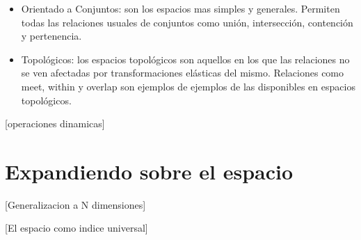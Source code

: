 \begin{itemize}
    \item Orientado a Conjuntos: son los espacios mas simples y generales. Permiten todas las relaciones usuales de conjuntos como unión, intersección, contención y pertenencia.
    \item Topológicos: los espacios topológicos son aquellos en los que las relaciones no se ven afectadas por transformaciones elásticas del mismo. Relaciones como meet, within y overlap son ejemplos de ejemplos de las disponibles en espacios topológicos.
\end{itemize}

[operaciones dinamicas]

\section{Expandiendo sobre el espacio} \label{sec:e4}
[Generalizacion a N dimensiones]

[El espacio como indice universal]